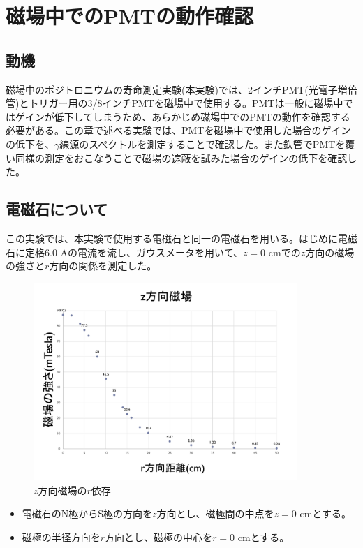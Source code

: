 \chapter{磁場中でのPMTの動作確認}\label{PMT}

\section{動機}
磁場中のポジトロニウムの寿命測定実験(本実験)では、2インチPMT(光電子増倍管)とトリガー用の3/8インチPMTを磁場中で使用する。PMTは一般に磁場中ではゲインが低下してしまうため、あらかじめ磁場中でのPMTの動作を確認する必要がある。この章で述べる実験では、PMTを磁場中で使用した場合のゲインの低下を、$\gamma$線源のスペクトルを測定することで確認した。また鉄管でPMTを覆い同様の測定をおこなうことで磁場の遮蔽を試みた場合のゲインの低下を確認した。



\section{電磁石について}
この実験では、本実験で使用する電磁石と同一の電磁石を用いる。はじめに電磁石に定格6.0 Aの電流を流し、ガウスメータを用いて、$z=0$ cmでの$z$方向の磁場の強さと$r$方向の関係を測定した。
\begin{figure}[H]
	\centering
		\includegraphics[width=10cm]{fig/iguchi/maggraph1.pdf}
	\caption{$z$方向磁場の$r$依存}
	\label{maggraph1}
\end{figure}

\begin{itemize}
       \item 電磁石のN極からS極の方向を$z$方向とし、磁極間の中点を$z=0$ cmとする。
       \item 磁極の半径方向を$r$方向とし、磁極の中心を$r=0$ cmとする。
\end{itemize}

